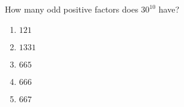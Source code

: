 How many odd positive factors does $30^{10}$ have?
\begin{enumerate}
\item $121$
\item $1331$
\item $665$
\item $666$
\item $667$
\end{enumerate}
